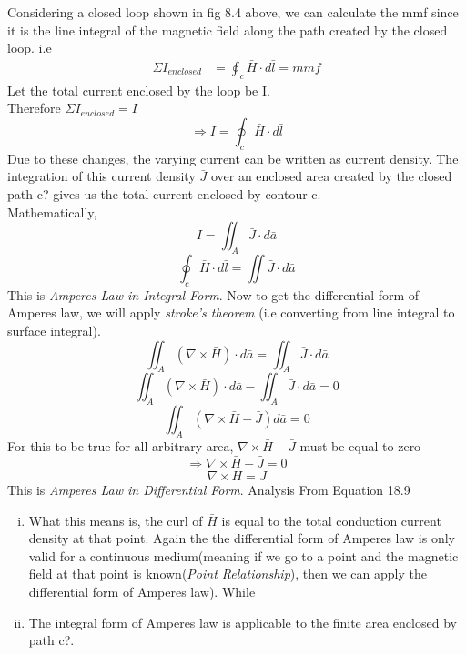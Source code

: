 Considering a closed loop shown in fig 8.4 above, we can calculate the mmf since it is the line integral of the magnetic field along the path created by the closed loop. i.e
\begin{align*}
\Sigma I_{enclosed} &= \oint_c\bar{H}\cdot d\bar{l} = mmf
\end{align*}
Let the total current enclosed by the loop be I.\\
Therefore $\Sigma I_{enclosed} = I$
\begin{equation*}
\Rightarrow I = \oint_c\bar{H}\cdot d\bar{l}
\end{equation*}
Due to these changes, the varying current can be written as current density. The  integration of this current density $\bar{J}$ over an enclosed area created by the closed path c? gives us the total current enclosed by contour c.\\
Mathematically,
\begin{equation*}
I = \iint_A\bar{J} \cdot d\bar{a}
\end{equation*}
\begin{equation}
\boxed{\oint_c\bar{H} \cdot d\bar{l} = \iint\bar{J} \cdot d\bar{a}}
\end{equation}
This is \emph{Amperes Law in Integral Form}. Now to get the differential form of Amperes law, we will apply \emph{stroke's theorem} (i.e converting from line integral to surface integral).
\begin{equation*}
\iint_A(\nabla \times \bar{H}) \cdot d\bar{a} = \iint_A\bar{J} \cdot d\bar{a}
\end{equation*}
\begin{equation*}
\iint_A(\nabla \times \bar{H}) \cdot d\bar{a} - \iint_A\bar{J} \cdot d\bar{a} = 0
\end{equation*}
\begin{equation*}
\iint_A(\nabla \times \bar{H} - \bar{J})d\bar{a} = 0
\end{equation*} 
For this to be true for all arbitrary area, $\nabla \times \bar{H} - \bar{J}$ must be equal to zero
\begin{equation*}
\Rightarrow \nabla \times \bar{H} - \bar{J} = 0
\end{equation*}
\begin{equation}
\boxed{\nabla \times \bar{H} = \bar{J}}
\end{equation}
This is \emph{Amperes Law in Differential Form}. Analysis From Equation 18.9
\begin{enumerate}[(i)]
\item What this means is, the curl of $\bar{H}$ is equal to the total conduction current density at that point. Again the the differential form of Amperes law is only valid for a continuous medium(meaning if we go to a point and the magnetic field at that point is known(\emph{Point Relationship}), then we can apply the differential form of Amperes law). While
\item The integral form of Amperes law is applicable to the finite area enclosed by path c?.
\end{enumerate}

